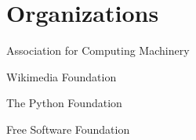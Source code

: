 \documentclass[]{deedy-resume-openfont}
\begin{document}
\begin{minipage}[t]{0.33\textwidth}
\section{Organizations}
\vspace{\topsep} %
\begin{tightemize}
\item Association for Computing Machinery\item Wikimedia Foundation\item The Python Foundation \item Free Software Foundation \end{tightemize}
\sectionsep
%
%

\end{minipage}
\hfill
\end{document}
